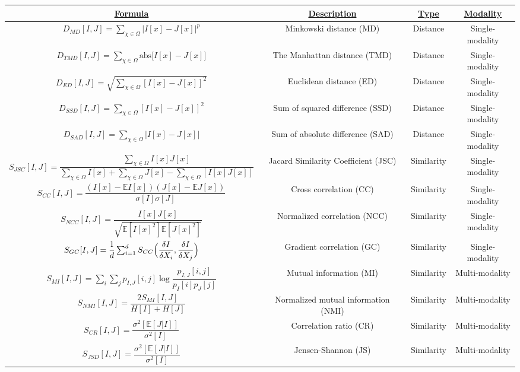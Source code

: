 \documentclass[10pt]{article}[draft]
\begin{document}
\begin{itemize}
		
	   \begin{landscape}
		\begin{table}
		\begin{tabular}{|c|c|c|c|}
				\hline 
			\underline{Formula} 								&  \underline{Description} & \underline{Type} & \underline{Modality}\\
			\hline
			$D_{MD} [I,J] = {\sum_{\chi \in \Omega}  \biggl|I[x] - J[x]\biggl|^p}$		 & Minkowski distance (MD) & Distance & Single-modality  \\
			\hline
			$D_{TMD} [I,J] = {\sum_{\chi \in \Omega} \text{abs} \biggl[I[x] - J[x]\biggl]}$		 & The Manhattan distance (TMD) & Distance & Single-modality \\
		\hline 
		$D_{ED} [I,J] = \sqrt{\sum_{\chi \in \Omega} [I[x] - J[x]]^2}$		 & Euclidean distance (ED) & Distance & Single-modality \\
		\hline
		$D_{SSD} [I,J] = \sum_{\chi \in \Omega} [I[x] - J[x]]^2$		 & Sum of squared difference (SSD) & Distance & Single-modality \\
		\hline
		$D_{SAD} [I,J] = \sum_{\chi \in \Omega} | I[x] - J[x] |$		 & Sum of absolute difference (SAD) & Distance & Single-modality \\
			\hline
		$S_{JSC} [I,J] = \dfrac{\sum_{\chi \in \Omega} I[x] J[x]}{  \sum_{\chi \in \Omega} I[x] + \sum_{\chi \in \Omega} J[x]  - \sum_{\chi \in \Omega} [ I[x] J[x] ]}$		 &  Jacard Similarity Coefficient (JSC) & Similarity & Single-modality  \\
		\hline
		$S_{CC} [I,J] = \dfrac{(I[x] -\mathbb{E}  I[x] ) (J[x] - \mathbb{E} J[x])}{{\sigma[I]} \sigma[J]}$		 &  Cross correlation (CC) & Similarity & Single-modality  \\
		\hline
		$S_{NCC} [I,J] = \dfrac{I[x] J[x]}{\sqrt{\mathbb{E} [I[x]^2] \mathbb{E} [J[x]^2]}}$		 &  Normalized  correlation (NCC) & Similarity & Single-modality \\
		\hline
		$S_{GC} [I,J] = \dfrac{1}{d} \sum_{i=1}^d S_{CC}\Bigl( \dfrac{\delta I}{\delta X_i}, \dfrac{\delta I}{\delta X_j} \Bigl)$		 & Gradient  correlation (GC) & Similarity & Single-modality \\
		\hline
		$S_{MI} [I,J] =  \sum_{i} \sum_{j} p_{I,J} [i,j] \log \dfrac{p_{I,J} [i,j] }{p_{I} [i]  p_{J} [j] }$		 & Mutual  information (MI) & Similarity & Multi-modality \\
		\hline
		$S_{NMI} [I,J] = \dfrac{2 S_{MI} [I,J] }{H[I] + H[J]}$		 & Normalized mutual  information (NMI) & Similarity & Multi-modality \\
		\hline
		$S_{CR} [I,J] = \dfrac{\sigma^2[\mathbb{E}[J|I]]}{\sigma^2[I]}$		 & Correlation ratio (CR) & Similarity & Multi-modality \\
		\hline
			$S_{JSD} [I,J] = \dfrac{\sigma^2[\mathbb{E}[J|I]]}{\sigma^2[I]}$		 & Jensen-Shannon (JS) & Similarity & Multi-modality \\
		\hline
		\end{tabular}
	   \end{table}
  \end{landscape}
	

\end{itemize}
\end{document}

